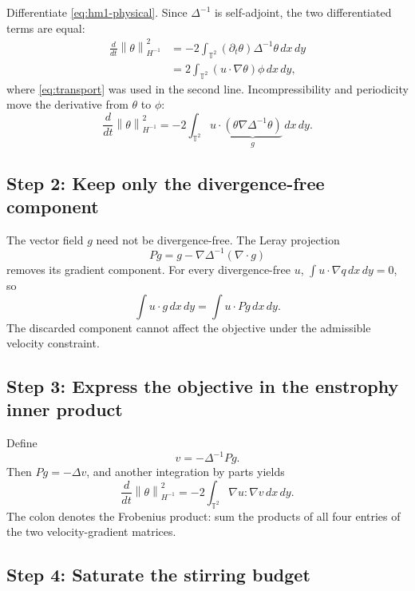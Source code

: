 \documentclass[12pt,a4paper]{article}
\newcommand{\norm}[1]{\left\lVert#1\right\rVert}
\newcommand{\Torus}{\mathbb{T}^2}
\newcommand{\Lap}{\Delta}
\newcommand{\lapinv}{\Delta^{-1}}
\newcommand{\Proj}{P}
\newcommand{\dx}{\,dx\,dy}
\theoremstyle{definition}
\begin{document}
Differentiate \eqref{eq:hm1-physical}. Since $\lapinv$ is self-adjoint,
the two differentiated terms are equal:
\begin{align}
  \frac{d}{dt}\norm{\theta}_{H^{-1}}^2
  &=-2\int_{\Torus}(\partial_t\theta)\lapinv\theta\dx \\
  &=2\int_{\Torus}(u\cdot\nabla\theta)\phi\dx,
\end{align}
where \eqref{eq:transport} was used in the second line. Incompressibility
and periodicity move the derivative from $\theta$ to $\phi$:
\begin{equation}
  \frac{d}{dt}\norm{\theta}_{H^{-1}}^2
  =-2\int_{\Torus}u\cdot
  \underbrace{(\theta\nabla\lapinv\theta)}_{g}\dx.
  \label{eq:first-variation}
\end{equation}

\subsection{Step 2: Keep only the divergence-free component}

The vector field $g$ need not be divergence-free. The Leray projection
\begin{equation}
  \Proj g=g-\nabla\lapinv(\nabla\cdot g)
  \label{eq:leray}
\end{equation}
removes its gradient component. For every divergence-free $u$,
$\int u\cdot\nabla q\dx=0$, so
\begin{equation}
  \int u\cdot g\dx=\int u\cdot\Proj g\dx.
\end{equation}
The discarded component cannot affect the objective under the admissible
velocity constraint.

\subsection{Step 3: Express the objective in the enstrophy inner product}

Define
\begin{equation}
  v=-\lapinv\Proj g.
  \label{eq:vdef}
\end{equation}
Then $\Proj g=-\Lap v$, and another integration by parts yields
\begin{equation}
  \frac{d}{dt}\norm{\theta}_{H^{-1}}^2
  =-2\int_{\Torus}\nabla u:\nabla v\dx.
  \label{eq:gradient-pairing}
\end{equation}
The colon denotes the Frobenius product: sum the products of all four
entries of the two velocity-gradient matrices.

\subsection{Step 4: Saturate the stirring budget}
\end{document}
